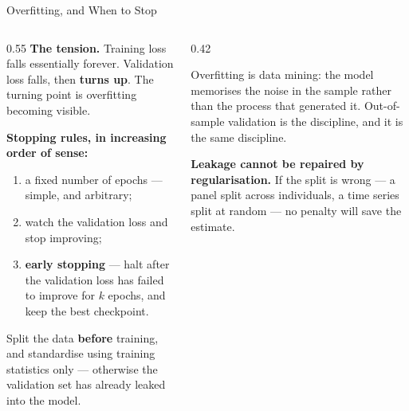 \begin{frame}{Overfitting, and When to Stop}
\begin{columns}[T]
\begin{column}{0.55\textwidth}
\small
\textbf{The tension.} Training loss falls essentially forever. Validation loss falls, then \textbf{turns up}. The turning point is overfitting becoming visible.
\medskip

\textbf{Stopping rules, in increasing order of sense:}
\begin{enumerate}\small\setlength{\itemsep}{0.9mm}
  \item a fixed number of epochs --- simple, and arbitrary;
  \item watch the validation loss and stop improving;
  \item \textbf{early stopping} --- halt after the validation loss has failed to improve for $k$ epochs, and keep the best checkpoint.
\end{enumerate}
\medskip

Split the data \textbf{before} training, and standardise using training statistics only --- otherwise the validation set has already leaked into the model.
\end{column}
\begin{column}{0.42\textwidth}
\begin{takeawaybox}[title=\textbf{The econometric name}]\small
Overfitting is data mining: the model memorises the noise in the sample rather than the process that generated it. Out-of-sample validation is the discipline, and it is the same discipline.
\end{takeawaybox}
\medskip
\begin{cautionbox}\footnotesize
\textbf{Leakage cannot be repaired by regularisation.} If the split is wrong --- a panel split across individuals, a time series split at random --- no penalty will save the estimate.
\end{cautionbox}
\end{column}
\end{columns}
\vspace{1mm}
\end{frame}

